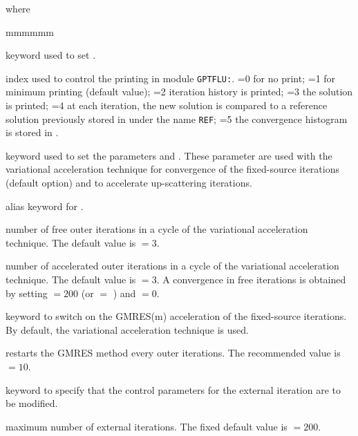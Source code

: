 \noindent where
\begin{ListeDeDescription}{mmmmmm}

\item[\moc{EDIT}] keyword used to set .

\item[\dusa{iprint}] index used to control  the printing in module {\tt GPTFLU:}.
=0 for no print; =1 for minimum printing (default value); =2 iteration history
is printed; =3 the solution is printed; =4 at each iteration, the new solution
is compared to a reference solution previously stored in  under
the name {\tt REF}; =5 the convergence histogram is stored in .

\item[\moc{VAR1}] keyword used to set the parameters  and . These parameter are used with the variational acceleration technique for convergence of the fixed-source iterations (default option) and to accelerate up-scattering iterations.

\item[\moc{ACCE}] alias keyword for .

\item[\dusa{icl1}] number of free outer iterations in a cycle of the variational acceleration technique. The default value is  $=3$.

\item[\dusa{icl2}] number of accelerated outer iterations in a cycle of the variational acceleration technique. The default value is  $=3$. A convergence in free iterations is obtained by setting  $=200$ (or  $=$ ) and  $=0$.

\item[\moc{GMRES}] keyword to switch on the GMRES(m) acceleration of the fixed-source iterations. By default, the variational acceleration technique is used.

\item[\dusa{nstart}] restarts the GMRES method every  outer iterations. The recommended value is  $=10$.

\item[\moc{EXTE}] keyword to specify that the control parameters for the
external iteration are to be modified. 

\item[\dusa{maxout}] maximum number of external iterations. The fixed default
value is  $=200$.


\end{ListeDeDescription}
